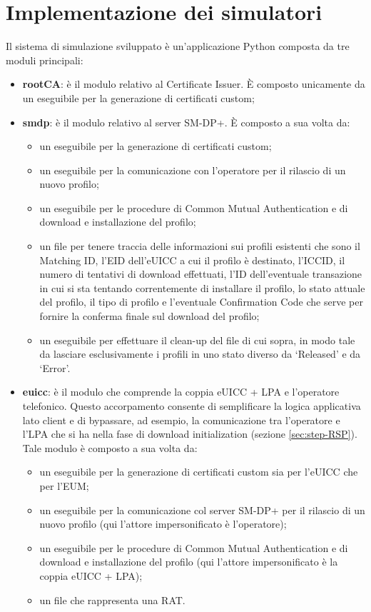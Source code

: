 \documentclass[10pt, oneside]{book}
\begin{document}
\section{Implementazione dei simulatori}
Il sistema di simulazione sviluppato è un'applicazione Python composta da tre moduli principali:
\begin{itemize}
\item \textbf{rootCA}: è il modulo relativo al Certificate Issuer. È composto unicamente da un eseguibile per la generazione di certificati custom;
\item \textbf{smdp}: è il modulo relativo al server SM-DP+. È composto a sua volta da:
\begin{itemize}
\item un eseguibile per la generazione di certificati custom;
\item un eseguibile per la comunicazione con l'operatore per il rilascio di un nuovo profilo;
\item un eseguibile per le procedure di Common Mutual Authentication e di download e installazione del profilo;
\item un file per tenere traccia delle informazioni sui profili esistenti che sono il Matching ID, l'EID dell'eUICC a cui il profilo è destinato, l'ICCID, il numero di tentativi di download effettuati, l'ID dell'eventuale transazione in cui si sta tentando correntemente di installare il profilo, lo stato attuale del profilo, il tipo di profilo e l'eventuale Confirmation Code che serve per fornire la conferma finale sul download del profilo;
\item un eseguibile per effettuare il clean-up del file di cui sopra, in modo tale da lasciare esclusivamente i profili in uno stato diverso da `Released' e da `Error'.
\end{itemize}
\item \textbf{euicc}: è il modulo che comprende la coppia eUICC + LPA e l'operatore telefonico. Questo accorpamento consente di semplificare la logica applicativa lato client e di bypassare, ad esempio, la comunicazione tra l'operatore e l'LPA che si ha nella fase di download initialization (sezione \ref{sec:step-RSP}). Tale modulo è composto a sua volta da:
\begin{itemize}
\item un eseguibile per la generazione di certificati custom sia per l'eUICC che per l'EUM;
\item un eseguibile per la comunicazione col server SM-DP+ per il rilascio di un nuovo profilo (qui l'attore impersonificato è l'operatore);
\item un eseguibile per le procedure di Common Mutual Authentication e di download e installazione del profilo (qui l'attore impersonificato è la coppia eUICC + LPA);
\item un file che rappresenta una RAT.
\end{itemize}
\end{itemize}
\end{document}
